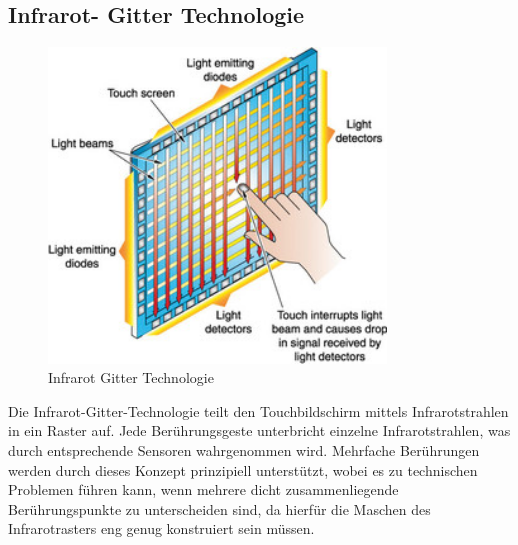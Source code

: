\documentclass[12pt,oneside,a4paper,bibtotoc,liststotoc]{scrreprt}
\begin{document}
\subsection{Infrarot- Gitter Technologie}
\begin{figure}[H]
  \begin{centering}
    \includegraphics[width=0.8\textwidth]{img/Infrarot_Gitter.jpg}
    \caption{Infrarot Gitter Technologie \cite[vgl. Infrarot-Gitter]{002}}
    \label{Infrarot_Gitter}
  \end{centering}
\end{figure}
Die Infrarot-Gitter-Technologie teilt den Touchbildschirm mittels Infrarotstrahlen in ein Raster auf. Jede Berührungsgeste unterbricht einzelne Infrarotstrahlen, was durch entsprechende Sensoren wahrgenommen wird. Mehrfache Berührungen werden durch dieses Konzept prinzipiell unterstützt, wobei es zu technischen Problemen führen kann, wenn mehrere dicht zusammenliegende Berührungspunkte zu unterscheiden sind, da hierfür die Maschen des Infrarotrasters eng genug konstruiert sein müssen.
\end{document}
